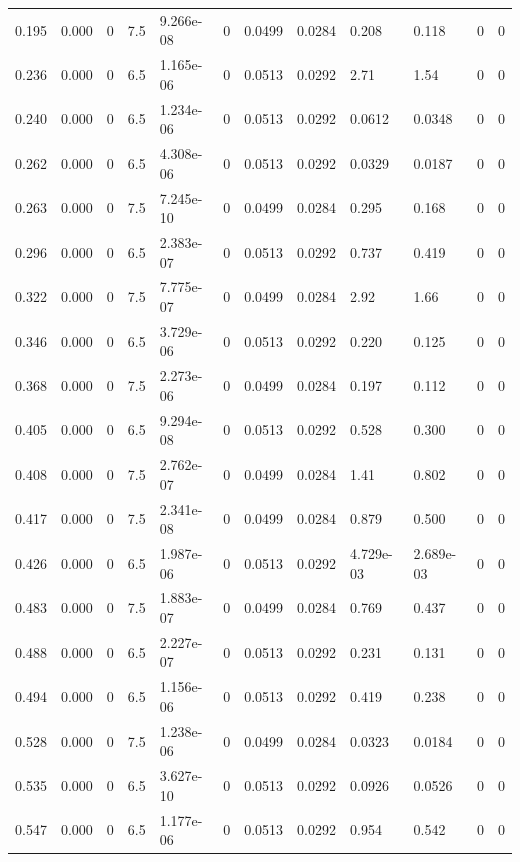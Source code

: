 \documentclass[preview]{standalone}
\begin{document}
{{\begin{tabular}{L{1.2cm}C{1.2cm} C{0.3cm}C{0.5cm} C{1.4cm}C{1.4cm} C{1.4cm}C{1.4cm} C{1.6cm}C{1.6cm} C{1.6cm}C{1.6cm}}
  0.195  &  0.000  & 0     & 7.5 &  9.266e-08  & 0  &  0.0499&   0.0284& 0.208 & 0.118   &  0 & 0  \\ 
  0.236  &  0.000  & 0     & 6.5 &  1.165e-06  & 0  &  0.0513&   0.0292& 2.71 & 1.54   &  0 & 0  \\ 
  0.240  &  0.000  & 0     & 6.5 &  1.234e-06  & 0  &  0.0513&   0.0292& 0.0612 & 0.0348   &  0 & 0  \\ 
  0.262  &  0.000  & 0     & 6.5 &  4.308e-06  & 0  &  0.0513&   0.0292& 0.0329 & 0.0187   &  0 & 0  \\ 
  0.263  &  0.000  & 0     & 7.5 &  7.245e-10  & 0  &  0.0499&   0.0284& 0.295 & 0.168   &  0 & 0  \\ 
  0.296  &  0.000  & 0     & 6.5 &  2.383e-07  & 0  &  0.0513&   0.0292& 0.737 & 0.419   &  0 & 0  \\ 
  0.322  &  0.000  & 0     & 7.5 &  7.775e-07  & 0  &  0.0499&   0.0284& 2.92 & 1.66   &  0 & 0  \\ 
  0.346  &  0.000  & 0     & 6.5 &  3.729e-06  & 0  &  0.0513&   0.0292& 0.220 & 0.125   &  0 & 0  \\ 
  0.368  &  0.000  & 0     & 7.5 &  2.273e-06  & 0  &  0.0499&   0.0284& 0.197 & 0.112   &  0 & 0  \\ 
  0.405  &  0.000  & 0     & 6.5 &  9.294e-08  & 0  &  0.0513&   0.0292& 0.528 & 0.300   &  0 & 0  \\ 
  0.408  &  0.000  & 0     & 7.5 &  2.762e-07  & 0  &  0.0499&   0.0284& 1.41 & 0.802   &  0 & 0  \\ 
  0.417  &  0.000  & 0     & 7.5 &  2.341e-08  & 0  &  0.0499&   0.0284& 0.879 & 0.500   &  0 & 0  \\ 
  0.426  &  0.000  & 0     & 6.5 &  1.987e-06  & 0  &  0.0513&   0.0292& 4.729e-03 & 2.689e-03   &  0 & 0  \\ 
  0.483  &  0.000  & 0     & 7.5 &  1.883e-07  & 0  &  0.0499&   0.0284& 0.769 & 0.437   &  0 & 0  \\ 
  0.488  &  0.000  & 0     & 6.5 &  2.227e-07  & 0  &  0.0513&   0.0292& 0.231 & 0.131   &  0 & 0  \\ 
  0.494  &  0.000  & 0     & 6.5 &  1.156e-06  & 0  &  0.0513&   0.0292& 0.419 & 0.238   &  0 & 0  \\ 
  0.528  &  0.000  & 0     & 7.5 &  1.238e-06  & 0  &  0.0499&   0.0284& 0.0323 & 0.0184   &  0 & 0  \\ 
  0.535  &  0.000  & 0     & 6.5 &  3.627e-10  & 0  &  0.0513&   0.0292& 0.0926 & 0.0526   &  0 & 0  \\ 
  0.547  &  0.000  & 0     & 6.5 &  1.177e-06  & 0  &  0.0513&   0.0292& 0.954 & 0.542   &  0 & 0  \\ 

\end{tabular}}}
\end{document}
